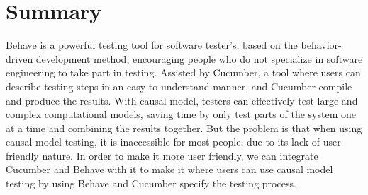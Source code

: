 \section{Summary}

Behave is a powerful testing tool for software tester’s, based on the behavior-driven development method, encouraging people who do not specialize in software engineering to take part in testing. Assisted by Cucumber, a tool where users can describe testing steps in an easy-to-understand manner, and Cucumber compile and produce the results. With causal model, testers can effectively test large and complex computational models, saving time by only test parts of the system one at a time and combining the results together. But the problem is that when using causal model testing, it is inaccessible for most people, due to its lack of user-friendly nature. In order to make it more user friendly, we can integrate Cucumber and Behave with it to make it where users can use causal model testing by using Behave and Cucumber specify the testing process.
